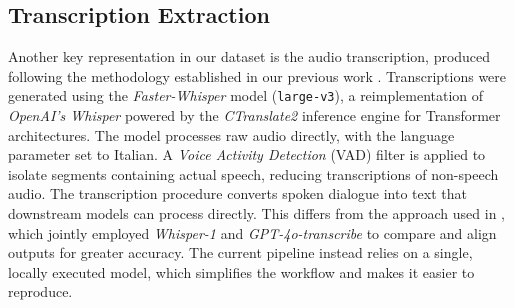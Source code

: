 \subsection*{Transcription Extraction}
Another key representation in our dataset is the audio transcription, produced following the methodology established in our previous work \cite{deodati2026lost}. Transcriptions were generated using the \textit{Faster-Whisper} model (\texttt{large-v3}), a reimplementation of \textit{OpenAI's Whisper} powered by the \textit{CTranslate2} inference engine for Transformer architectures. The model processes raw audio directly, with the language parameter set to Italian. A \textit{Voice Activity Detection} (VAD) filter is applied to isolate segments containing actual speech, reducing transcriptions of non-speech audio.
The transcription procedure converts spoken dialogue into text that downstream models can process directly. This differs from the approach used in \cite{deodati2026lost}, which jointly employed \textit{Whisper-1} and \textit{GPT-4o-transcribe} to compare and align outputs for greater accuracy. The current pipeline instead relies on a single, locally executed model, which simplifies the workflow and makes it easier to reproduce.
